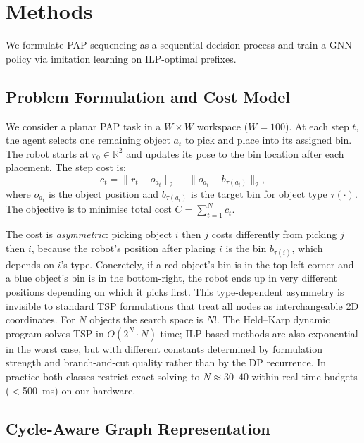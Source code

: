 \documentclass[review,times]{elsarticle}
\begin{document}
\section{Methods}\label{sec:methods}

We formulate PAP sequencing as a sequential decision process and train a GNN policy via imitation learning on ILP-optimal prefixes.

\subsection{Problem Formulation and Cost Model}

We consider a planar PAP task in a $W \times W$ workspace ($W=100$). At each step $t$, the agent selects one remaining object $a_t$ to pick and place into its assigned bin. The robot starts at $r_0 \in \mathbb{R}^2$ and updates its pose to the bin location after each placement. The step cost is:
\begin{equation}
c_t = \lVert r_t - o_{a_t} \rVert_2 + \lVert o_{a_t} - b_{\tau(a_t)} \rVert_2,
\end{equation}
where $o_{a_t}$ is the object position and $b_{\tau(a_t)}$ is the target bin for object type $\tau(\cdot)$. The objective is to minimise total cost $C = \sum_{t=1}^{N} c_t$.

The cost is \emph{asymmetric}: picking object $i$ then $j$ costs differently from picking $j$ then $i$, because the robot's position after placing $i$ is the bin $b_{\tau(i)}$, which depends on $i$'s type. Concretely, if a red object's bin is in the top-left corner and a blue object's bin is in the bottom-right, the robot ends up in very different positions depending on which it picks first. This type-dependent asymmetry is invisible to standard TSP formulations that treat all nodes as interchangeable 2D coordinates. For $N$ objects the search space is $N!$. The Held--Karp dynamic program \cite{held1962dp} solves TSP in $O(2^N \cdot N)$ time; ILP-based methods are also exponential in the worst case, but with different constants determined by formulation strength and branch-and-cut quality rather than by the DP recurrence. In practice both classes restrict exact solving to $N \approx 30$--$40$ within real-time budgets ($<$500~ms) on our hardware.

\subsection{Cycle-Aware Graph Representation}
\end{document}
